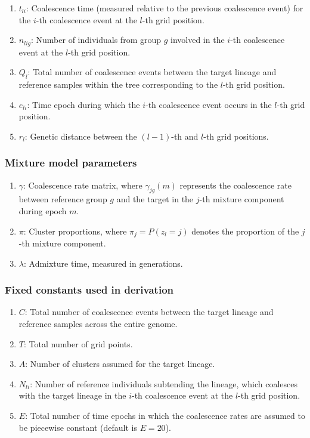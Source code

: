 \begin{enumerate}
\itemsep-0.3em 
    \item $t_{li}$: Coalescence time (measured relative to the previous coalescence event) for the $i$-th coalescence event at the $l$-th grid position.
    \item $n_{lig}$: Number of individuals from group $g$ involved in the $i$-th coalescence event at the $l$-th grid position.
    \item $Q_l$: Total number of coalescence events between the target lineage and reference samples within the tree corresponding to the $l$-th grid position.
    \item $e_{li}$: Time epoch during which the $i$-th coalescence event occurs in the $l$-th grid position.
    \item $r_l$: Genetic distance between the $(l-1)$-th and $l$-th grid positions.
\end{enumerate}

\subsubsection{Mixture model parameters}
    
\begin{enumerate}
\itemsep-0.3em 
    \item $\gamma$: Coalescence rate matrix, where $\gamma_{jg}(m)$ represents the coalescence rate between reference group $g$ and the target in the $j$-th mixture component during epoch $m$.
    \item $\pi$: Cluster proportions, where $\pi_j = P(z_l = j)$ denotes the proportion of the $j$-th mixture component.
    \item $\lambda$: Admixture time, measured in generations.
\end{enumerate}


\subsubsection{Fixed constants used in derivation}
    
\begin{enumerate}
\itemsep-0.3em 
    \item $C$: Total number of coalescence events between the target lineage and reference samples across the entire genome.
    \item $T$: Total number of grid points.
    \item $A$: Number of clusters assumed for the target lineage.
    \item $N_{li}$: Number of reference individuals subtending the lineage, which coalesces with the target lineage in the $i$-th coalescence event at the $l$-th grid position.
    \item $E$: Total number of time epochs in which the coalescence rates are assumed to be piecewise constant (default is $E = 20$).
\end{enumerate}


